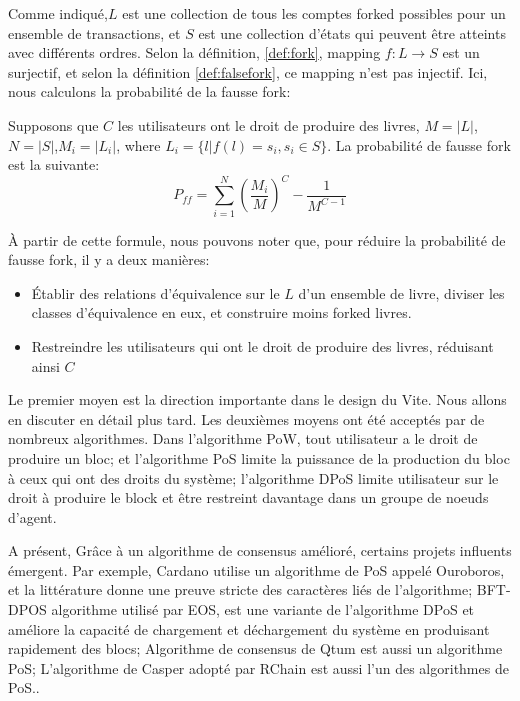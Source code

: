\documentclass[UTF8,nofonts]{article}
\begin{document}
\begin{multicols}{2}
Comme indiqué,$L$ est une collection de tous les comptes forked possibles pour un ensemble de transactions, et $S$ est une collection d'états qui peuvent être atteints avec différents ordres. Selon la définition, \ref{def:fork}, mapping $f: L \rightarrow S$ est un surjectif, et selon la définition \ref{def:falsefork}, ce mapping n'est pas injectif. Ici, nous calculons la probabilité de la fausse fork:

Supposons que $C$ les utilisateurs ont le droit de produire des livres, $M = \vert L \vert$,$N = \vert S \vert$,$M_{i} = \vert L_{i} \vert$, where $L_{i} = \lbrace l \vert f(l) = s_{i}, s_{i} \in S \rbrace$.
La probabilité de fausse fork est la suivante:
\begin{equation}
P_{ff} = \sum_{i=1}^{N}\left ( \frac{M_{i}}{M} \right )^{C} - \frac{1}{M^{C-1}}
\end{equation}

À partir de cette formule, nous pouvons noter que, pour réduire la probabilité de fausse fork, il y a deux manières:
\begin{itemize}
	\item   Établir des relations d'équivalence sur le $L$ d'un ensemble de livre, diviser les classes d'équivalence en eux, et construire moins forked livres.
	\item   Restreindre les utilisateurs qui ont le droit de produire des livres, réduisant ainsi $C$
\end{itemize}

Le premier moyen est la direction importante dans le design du Vite. Nous allons en discuter en détail plus tard. Les deuxièmes moyens ont été acceptés par de nombreux algorithmes. Dans l'algorithme PoW, tout utilisateur a le droit de produire un bloc; et l'algorithme PoS limite la puissance de la production du bloc à ceux qui ont des droits du système; l'algorithme DPoS  \cite{dpos} limite utilisateur sur le droit à  produire le block et être restreint davantage dans un groupe de noeuds d'agent.
	
A présent, Grâce à un algorithme de consensus amélioré, certains projets influents émergent.
Par exemple, Cardano utilise un algorithme de PoS appelé Ouroboros, et la littérature \cite{bernardo2017ouroboros} donne une preuve stricte des caractères liés de l'algorithme; BFT-DPOS algorithme utilisé par EOS\cite{eos}, est une variante de l'algorithme DPoS et améliore la capacité de chargement et déchargement du système en produisant rapidement des blocs; Algorithme de consensus de Qtum \cite{dai2017smart} est aussi un algorithme PoS; L'algorithme de Casper adopté par RChain \cite{rchain} est aussi l'un des algorithmes de PoS..


\end{multicols}
\end{document}
